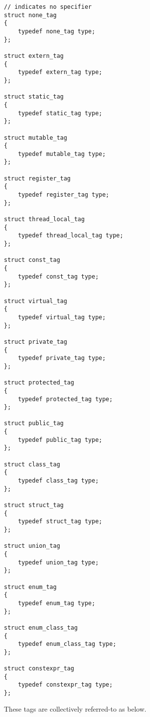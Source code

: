\begin{verbatim}
// indicates no specifier
struct none_tag
{
	typedef none_tag type;
};

struct extern_tag
{
	typedef extern_tag type;
};

struct static_tag
{
	typedef static_tag type;
};

struct mutable_tag
{
	typedef mutable_tag type;
};

struct register_tag
{
	typedef register_tag type;
};

struct thread_local_tag
{
	typedef thread_local_tag type;
};

struct const_tag
{
	typedef const_tag type;
};

struct virtual_tag
{
	typedef virtual_tag type;
};

struct private_tag
{
	typedef private_tag type;
};

struct protected_tag
{
	typedef protected_tag type;
};

struct public_tag
{
	typedef public_tag type;
};

struct class_tag
{
	typedef class_tag type;
};

struct struct_tag
{
	typedef struct_tag type;
};

struct union_tag
{
	typedef union_tag type;
};

struct enum_tag
{
	typedef enum_tag type;
};

struct enum_class_tag
{
	typedef enum_class_tag type;
};

struct constexpr_tag
{
	typedef constexpr_tag type;
};

\end{verbatim}

These tags are collectively referred-to as \verb@SpecifierCategory@ below.

